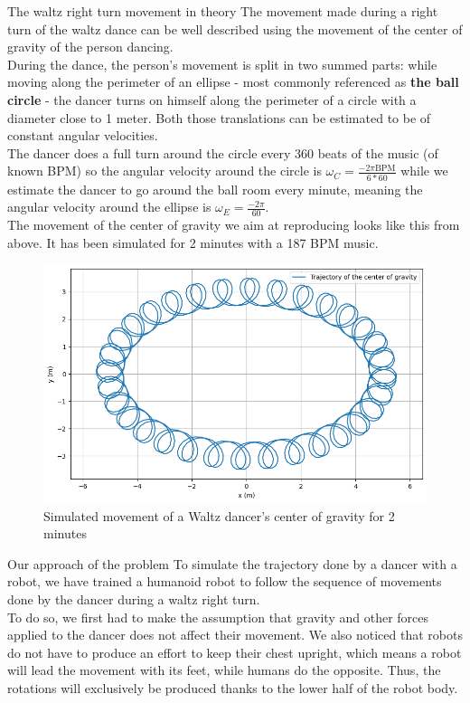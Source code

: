 \documentclass[final]{beamer}
\newlength{\colwidth}
\begin{document}
\begin{frame}[t]
\begin{columns}[t]
\begin{column}{\colwidth}
  \begin{block}{The waltz right turn movement in theory}
The movement made during a right turn of the waltz dance can be well described using the movement of the center of gravity of the person dancing. \\ During the dance, the person's movement is split in two summed parts: while moving along the perimeter of an ellipse - most commonly referenced as \textbf{the ball circle} - the dancer turns on himself along the perimeter of a circle with a diameter close to 1 meter. Both those translations can be estimated to be of constant angular velocities. \\ The dancer does a full turn around the circle every 360 beats of the music (of known BPM) so the angular velocity around the circle is $\omega_C = \frac{-2\pi \text{BPM}}{6*60}$ while we estimate the dancer to go around the ball room every minute, meaning the angular velocity around the ellipse is $\omega_E = \frac{-2\pi}{60}$. \\ The movement of the center of gravity we aim at reproducing looks like this from above. It has been simulated for 2 minutes with a 187 BPM music.
    \begin{figure}
      \centering
      \includegraphics[width = 0.99 \columnwidth]{img/waltz_cog_movement.png} 
      \caption{Simulated movement of a Waltz dancer's center of gravity for 2 minutes}
    \end{figure}
  \end{block}
 \begin{alertblock}{Our approach of the problem}
To simulate the trajectory done by a dancer with a robot, we have trained a humanoid robot to follow the sequence of movements done by the dancer during a waltz right turn. \\ To do so, we first had to make the assumption that gravity and other forces applied to the dancer does not affect their movement. We also noticed that robots do not have to produce an effort to keep their chest upright, which means a robot will lead the movement with its feet, while humans do the opposite. Thus, the rotations will exclusively be produced thanks to the lower half of the robot body. \\

\end{alertblock}
\end{column}
\end{columns}
\end{frame}
\end{document}
